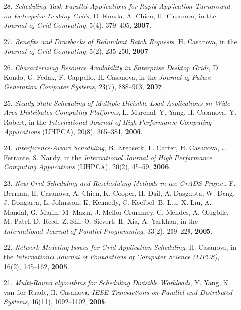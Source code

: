 \begin{enumerate}
\item[28.] {\it Scheduling Task Parallel Applications for Rapid Application Turnaround on Enterprise Desktop Grids}, D. Kondo, A. Chien, H. Casanova,  in the \emph{Journal of Grid Computing}, 5(4), 379--405, {\bf 2007}.

\item[27.] {\it Benefits and Drawbacks of Redundant Batch Requests}, H. Casanova, in the \emph{Journal of Grid Computing}, 5(2), 235-250, {\bf 2007}

\item[26.] {\it Characterizing Resource Availability in Enterprise Desktop
Grids}, D. Kondo, G. Fedak, F. Cappello, H. Casanova, in the \emph{Journal
of Future Generation Computer Systems}, 23(7), 888--903, {\bf 2007}.

\item[25.] {\it Steady-State Scheduling of Multiple Divisible Load
Applications on Wide-Area Distributed Computing Platforms}, L. Marchal, Y.
Yang, H. Casanova, Y. Robert, in the \emph{International Journal
of High Performance Computing Applications} (IJHPCA), 20(8), 365--381,
{\bf 2006}.

\item [24.] {\it Interference-Aware Scheduling}, B. Kreaseck,
L. Carter, H. Casanova, J. Ferrante, S. Nandy, 
in the \emph{International Journal of High Performance Computing
Applications} (IJHPCA), 20(2), 45--59, {\bf 2006}.

\item [23.]
{\it New Grid Scheduling and Rescheduling Methods in the GrADS Project},
F. Berman, H. Casanova, A. Chien, K. Cooper, H. Dail, A. Dasgupta, W. Deng, J. Dongarra, L. Johnsson, K. Kennedy, C. Koelbel, B. Liu, X. Liu, A. Mandal, G. Marin, M. Mazin, J. Mellor-Crummey, C. Mendes, A. Olugbile, M. Patel, D. Reed, Z. Shi, O. Sievert, H. Xia, A. Yarkhan, in the \emph{International Journal of Parallel Programming}, 33(2), 209--229, {\bf 2005}. 

\item [22.]
{\it Network Modeling Issues for Grid Application Scheduling}, 
H. Casanova, in the \emph{International Journal of 
Foundations of Computer Science (IJFCS)}, 16(2), 145--162, {\bf 2005}.

\item [21.] 
{\it Multi-Round algorithms for Scheduling Divisible Workloads},
Y. Yang, K. van der Raadt, H. Casanova, \emph{IEEE Transactions on
Parallel and Distributed Systems}, 16(11), 1092--1102, {\bf 2005}.


\end{enumerate}
